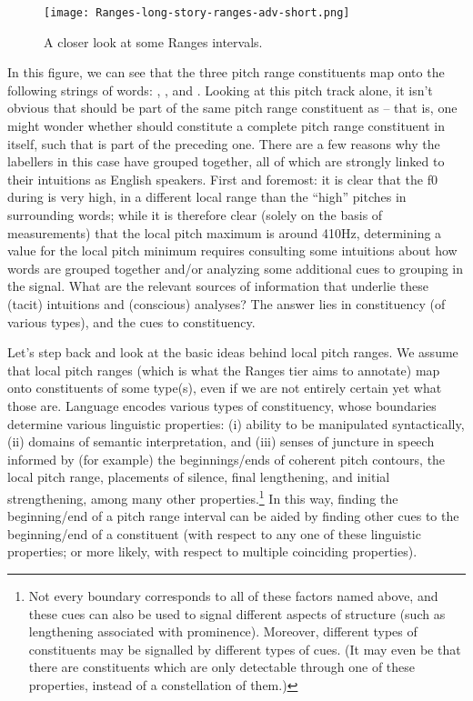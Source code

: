 \begin{figure}[H]
\centering
%
\texttt{[image: Ranges-long-story-ranges-adv-short.png]}
%
\caption{A closer look at some Ranges intervals.%
\label{fig:long-story-ranges short Ranges Adv}%
}
\end{figure}

In this figure, we can see that the three pitch range constituents map onto the following strings of words: , , and . Looking at this pitch track alone, it isn’t obvious that  should be part of the same pitch range constituent as  – that is, one might wonder whether  should constitute a complete pitch range constituent in itself, such that  is part of the preceding one. There are a few reasons why the labellers in this case have grouped  together, all of which are strongly linked to their intuitions as English speakers. First and foremost: it is clear that the f0 during  is very high, in a different local range than the “high” pitches in surrounding words; while it is therefore clear (solely on the basis of measurements) that the local pitch maximum is around 410Hz, determining a value for the local pitch minimum requires consulting some intuitions about how words are grouped together and/or analyzing some additional cues to grouping in the signal. What are the relevant sources of information that underlie these (tacit) intuitions and (conscious) analyses? The answer lies in constituency (of various types), and the cues to constituency.

Let’s step back and look at the basic ideas behind local pitch ranges. We assume that local pitch ranges (which is what the Ranges tier aims to annotate) map onto constituents of some type(s), even if we are not entirely certain yet what those are. Language encodes various types of constituency, whose boundaries determine various linguistic properties: (i) ability to be manipulated syntactically, (ii) domains of semantic interpretation, and (iii) senses of juncture in speech informed by (for example) the beginnings\slash ends of coherent pitch contours, the local pitch range, placements of silence, final lengthening, and initial strengthening, among many other properties.\footnote{Not every boundary corresponds to all of these factors named above, and these cues can also be used to signal different aspects of structure (such as lengthening associated with prominence). Moreover, different types of constituents may be signalled by different types of cues. (It may even be that there are constituents which are only detectable through one of these properties, instead of a constellation of them.)} In this way, finding the beginning\slash end of a pitch range interval can be aided by finding other cues to the beginning\slash end of a constituent (with respect to any one of these linguistic properties; or more likely, with respect to multiple coinciding properties).

